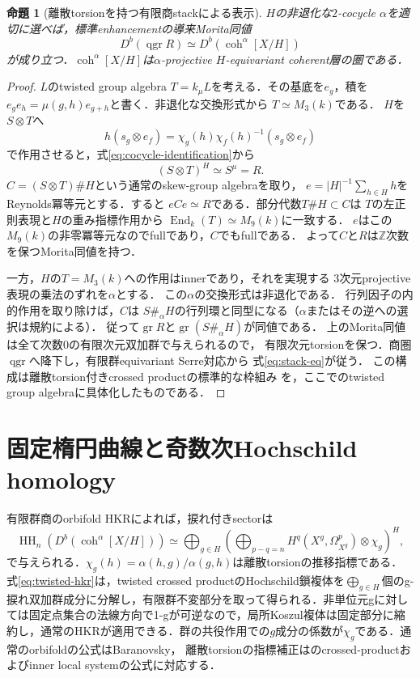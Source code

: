 \documentclass[11pt,a4paper]{ltjsarticle}
\newtheorem{proposition}[theorem]{命題}
\theoremstyle{definition}
\newcommand{\qgr}{\operatorname{qgr}}
\newcommand{\coh}{\operatorname{coh}}
\newcommand{\HH}{\operatorname{HH}}
\begin{document}
\begin{proposition}[離散torsionを持つ有限商stackによる表示]
\label{prop:stack-equivalence}
$H$の非退化な$2$-cocycle $\alpha$を適切に選べば，標準enhancementの導来Morita同値
\begin{equation}\label{eq:stack-eq}
 D^b(\qgr R)\simeq D^b(\coh^\alpha[X/H])
\end{equation}
が成り立つ．$\coh^\alpha[X/H]$は$\alpha$-projective $H$-equivariant coherent層の圏である．
\end{proposition}
\begin{proof}
$L$のtwisted group algebra $T=k_\mu L$を考える．その基底を$e_g$，積を
$e_ge_h=\mu(g,h)e_{g+h}$と書く．非退化な交換形式から
$T\simeq M_3(k)$である．
$H$を$S\otimes T$へ
\[
 h(s_g\otimes e_f)=\chi_g(h)\chi_f(h)^{-1}(s_g\otimes e_f)
\]
で作用させると，式\eqref{eq:cocycle-identification}から
\[
 (S\otimes T)^H\simeq S^\mu=R.
\]
$C=(S\otimes T)\# H$という通常のskew-group algebraを取り，
$e=|H|^{-1}\sum_{h\in H}h$をReynolds冪等元とする．すると
$eCe\simeq R$である．部分代数$T\# H\subset C$は
$T$の左正則表現と$H$の重み指標作用から
$\operatorname{End}_k(T)\simeq M_9(k)$に一致する．
$e$はこの$M_9(k)$の非零冪等元なのでfullであり，$C$でもfullである．
よって$C$と$R$は$\mathbb Z$次数を保つMorita同値を持つ．

一方，$H$の$T=M_3(k)$への作用はinnerであり，それを実現する
$3$次元projective表現の乗法のずれを$\alpha$とする．
この$\alpha$の交換形式は非退化である．
行列因子の内的作用を取り除けば，$C$は
$S\#_\alpha H$の行列環と同型になる（$\alpha$またはその逆への選択は規約による）．
従って$\operatorname{gr}R$と$\operatorname{gr}(S\#_\alpha H)$が同値である．
上のMorita同値は全て次数0の有限次元双加群で与えられるので，
有限次元torsionを保つ．商圏$\qgr$へ降下し，有限群equivariant Serre対応から
式\eqref{eq:stack-eq}が従う．
この構成は離散torsion付きcrossed productの標準的な枠組み
\cite{CGW}を，ここでのtwisted group algebraに具体化したものである．
\end{proof}

\section{固定楕円曲線と奇数次Hochschild homology}
有限群商のorbifold HKRによれば，捩れ付きsectorは
\begin{equation}\label{eq:twisted-hkr}
 \HH_n(D^b(\coh^\alpha[X/H]))
 \simeq \bigoplus_{g\in H}
 \left(\bigoplus_{p-q=n}H^q(X^g,\Omega^p_{X^g})
 \otimes\chi_g\right)^H,
\end{equation}
で与えられる．$\chi_g(h)=\alpha(h,g)/\alpha(g,h)$は離散torsionの推移指標である．
式\eqref{eq:twisted-hkr}は，twisted crossed productのHochschild鎖複体を\(\bigoplus_{g\in H}\)個のg-捩れ双加群成分に分解し，有限群不変部分を取って得られる．非単位元gに対しては固定点集合の法線方向で1-gが可逆なので，局所Koszul複体は固定部分に縮約し，通常のHKRが適用できる．群の共役作用での$g$成分の係数が$\chi_g$である．通常のorbifoldの公式はBaranovsky\cite{Baranovsky}，
離散torsionの指標補正は\cite{CGW,Ruan}のcrossed-productおよびinner local systemの公式に対応する．
\end{document}
